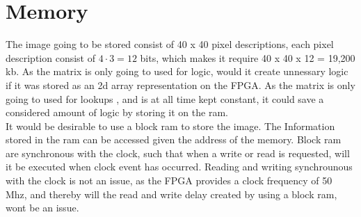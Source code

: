 \section{Memory}
The image going to be stored consist of 40 x 40 pixel descriptions, each pixel description consist of $4 \cdot 3 = 12$ bits,  which makes it require 40 x 40 x 12   =  19,200 kb.  As the matrix is only going to used for logic, would it create unnessary logic if it was stored as an 2d array representation on the FPGA. As the matrix is only going to used for lookups , and is at all time kept constant, it could save a considered amount of logic by storing it on the ram. 	\\
It would be desirable to use a block ram to store the image.  The Information stored in the ram can be accessed given the address of the memory. Block ram are synchronous with the clock, such that when a write or read is requested, will it be executed when clock event has occurred. Reading and writing synchrounous with the clock is not an issue, as the FPGA provides a clock frequency of 50 Mhz, and thereby will the read and write delay created by using a block ram, wont be an issue. 

